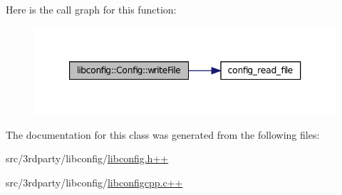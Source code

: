 Here is the call graph for this function:
\nopagebreak
\begin{figure}[H]
\begin{center}
\leavevmode
\includegraphics[width=344pt]{classlibconfig_1_1_config_a9ee45e1ab444c2865bf076fbf4219326_cgraph}
\end{center}
\end{figure}




The documentation for this class was generated from the following files:\begin{DoxyCompactItemize}
\item 
src/3rdparty/libconfig/\hyperlink{libconfig_8h_09_09}{libconfig.h++}\item 
src/3rdparty/libconfig/\hyperlink{libconfigcpp_8c_09_09}{libconfigcpp.c++}\end{DoxyCompactItemize}
